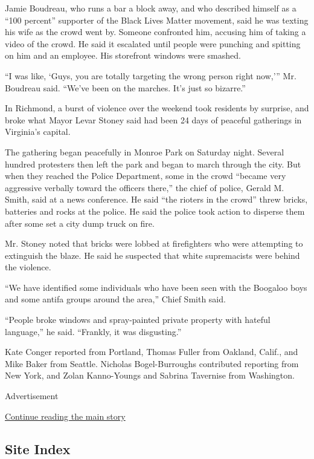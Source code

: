 Jamie Boudreau, who runs a bar a block away, and who described himself
as a ``100 percent'' supporter of the Black Lives Matter movement, said
he was texting his wife as the crowd went by. Someone confronted him,
accusing him of taking a video of the crowd. He said it escalated until
people were punching and spitting on him and an employee. His storefront
windows were smashed.

``I was like, `Guys, you are totally targeting the wrong person right
now,''' Mr. Boudreau said. ``We've been on the marches. It's just so
bizarre.''

In Richmond, a burst of violence over the weekend took residents by
surprise, and broke what Mayor Levar Stoney said had been 24 days of
peaceful gatherings in Virginia's capital.

The gathering began peacefully in Monroe Park on Saturday night. Several
hundred protesters then left the park and began to march through the
city. But when they reached the Police Department, some in the crowd
``became very aggressive verbally toward the officers there,'' the chief
of police, Gerald M. Smith, said at a news conference. He said ``the
rioters in the crowd'' threw bricks, batteries and rocks at the police.
He said the police took action to disperse them after some set a city
dump truck on fire.

Mr. Stoney noted that bricks were lobbed at firefighters who were
attempting to extinguish the blaze. He said he suspected that white
supremacists were behind the violence.

``We have identified some individuals who have been seen with the
Boogaloo boys and some antifa groups around the area,'' Chief Smith
said.

``People broke windows and spray-painted private property with hateful
language,'' he said. ``Frankly, it was disgusting.''

Kate Conger reported from Portland, Thomas Fuller from Oakland, Calif.,
and Mike Baker from Seattle. Nicholas Bogel-Burroughs contributed
reporting from New York, and Zolan Kanno-Youngs and Sabrina Tavernise
from Washington.

Advertisement

\protect\hyperlink{after-bottom}{Continue reading the main story}

\hypertarget{site-index}{%
\subsection{Site Index}\label{site-index}}


